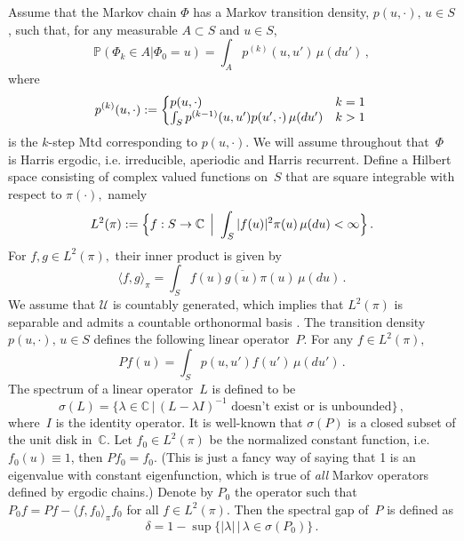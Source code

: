 \documentclass[11pt]{article}
\begin{document}
        Assume that the Markov chain $\Phi$ has a Markov transition
        density, $p(u, \cdot),\,u \in S$, such that, for any
        measurable $A \subset S$ and $u \in S$,
	\[
	\mathbb{P}(\Phi_k \in A|\Phi_0 = u) = \int_A p^{(k)}(u,u') \,
        \mu(du') \,,
	\]
	where
	\[
	p^{(k)}(u,\cdot) := \left\{
	\begin{array}{@{}ll@{}}
	p(u,\cdot)  & k=1 \\
	\int_S p^{(k-1)}(u,u') p(u',\cdot) \, \mu(du') & k > 1 \,
	\end{array} \right. 
	\]
	is the $k$-step Mtd corresponding to $p(u,\cdot)$.  We will
        assume throughout that~$\Phi$ is Harris ergodic,
        i.e. irreducible, aperiodic and Harris recurrent. Define a
        Hilbert space consisting of complex valued functions on~$S$
        that are square integrable with respect to $\pi(\cdot),$
        namely
	\[
	L^2(\pi) := \Big\{ f:S \to \mathbb{C} \; \Big \arrowvert \,
        \int_{S} |f(u)|^2 \pi(u) \, \mu(du) < \infty \Big\} \,.
	\]
	For $f, g \in L^2(\pi),$ their inner product is given by
	\[
	\langle f, g \rangle_{\pi} = \int_{S} f(u) \overline{g(u)}
        \pi(u) \, \mu(du) \,.
	\]
	We assume that $\mathcal{U}$ is countably generated, which
        implies that $L^2(\pi)$ is separable and admits a countable
        orthonormal basis \citep[see
        e.g.][Theorem~19.2]{billingsley2008probability}. The
        transition density $p(u,\cdot), \, u\in S$ defines the
        following linear operator~$P.$ For any $f \in L^2(\pi),$
	\[
	Pf(u) = \int_{S} p(u,u') f(u') \, \mu(du') \,.
	\]
	The spectrum of a linear operator~$L$ is defined to be
	\[
	\sigma(L) = \big \{ \lambda \in \mathbb{C} \, \big | \,
        (L-\lambda I)^{-1} \text{ doesn't exist or is unbounded} \big
        \} \,,
	\]
	where~$I$ is the identity operator. It is well-known that
        $\sigma(P)$ is a closed subset of the unit disk
        in~$\mathbb{C}.$ Let $f_0 \in L^2(\pi)$ be the normalized
        constant function, i.e. $f_0(u) \equiv 1$, then $Pf_0 = f_0$.
        (This is just a fancy way of saying that 1 is an eigenvalue
        with constant eigenfunction, which is true of \textit{all}
        Markov operators defined by ergodic chains.)  Denote by $P_0$ the operator such that
        $P_0 f = Pf - \langle f, f_0 \rangle_{\pi} f_0$ for all $f \in
        L^2(\pi).$ Then the spectral gap of~$P$ is defined as
	\[
	\delta = 1 - \sup \Big\{ |\lambda| \, \Big| \, \lambda \in
        \sigma(P_0) \Big\} \,.
	\]
\end{document}
